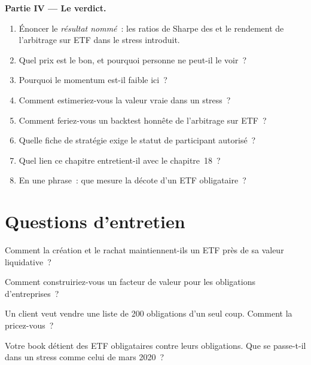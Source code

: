 \begin{problem}
\medskip\noindent\textbf{Partie IV --- Le verdict.}
\begin{enumerate}[resume]
\item Énoncer le \emph{résultat nommé}~: les ratios de Sharpe des  et le rendement de l'arbitrage sur ETF dans le stress introduit.
\item Quel prix est le bon, et pourquoi personne ne peut-il le voir~?
\item Pourquoi le momentum est-il faible ici~?
\item Comment estimeriez-vous la valeur vraie dans un stress~?
\item Comment feriez-vous un backtest honnête de l'arbitrage sur ETF~?
\item Quelle fiche de stratégie exige le statut de participant autorisé~?
\item Quel lien ce chapitre entretient-il avec le chapitre~18~?
\item En une phrase~: que mesure la décote d'un ETF obligataire~?
\end{enumerate}
\end{problem}

\section{Questions d'entretien}

\begin{interviewq}\label{iq:s2:systematic-credit-and-bond-etf-arbitrage:1}
Comment la création et le rachat maintiennent-ils un ETF près de sa valeur liquidative~?
\end{interviewq}

\begin{interviewq}\label{iq:s2:systematic-credit-and-bond-etf-arbitrage:2}
Comment construiriez-vous un facteur de valeur pour les obligations d'entreprises~?
\end{interviewq}

\begin{interviewq}\label{iq:s2:systematic-credit-and-bond-etf-arbitrage:3}
Un client veut vendre une liste de 200 obligations d'un seul coup. Comment la pricez-vous~?
\end{interviewq}

\begin{interviewq}\label{iq:s2:systematic-credit-and-bond-etf-arbitrage:4}
Votre book détient des ETF obligataires contre leurs obligations. Que se passe-t-il dans un stress comme celui de mars 2020~?
\end{interviewq}

